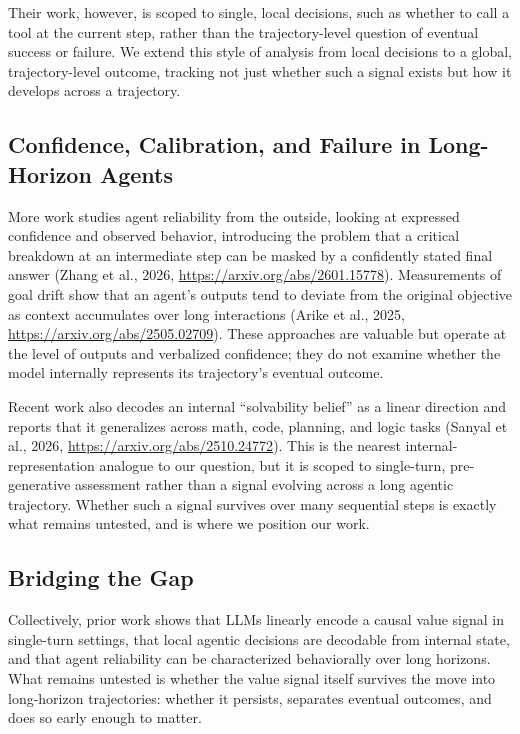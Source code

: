 \documentclass{article}
\begin{document}
Their work, however, is scoped to single, local decisions, such as whether to call a tool at the current step, rather than the trajectory-level question of eventual success or failure. We extend this style of analysis from local decisions to a global, trajectory-level outcome, tracking not just whether such a signal exists but how it develops across a trajectory.

\subsection{Confidence, Calibration, and Failure in Long-Horizon Agents}

More work studies agent reliability from the outside, looking at expressed confidence and observed behavior, introducing the problem that a critical breakdown at an intermediate step can be masked by a confidently stated final answer (Zhang et al., 2026, \url{https://arxiv.org/abs/2601.15778}). Measurements of goal drift show that an agent's outputs tend to deviate from the original objective as context accumulates over long interactions (Arike et al., 2025, \url{https://arxiv.org/abs/2505.02709}). These approaches are valuable but operate at the level of outputs and verbalized confidence; they do not examine whether the model internally represents its trajectory's eventual outcome.

Recent work also decodes an internal ``solvability belief'' as a linear direction and reports that it generalizes across math, code, planning, and logic tasks (Sanyal et al., 2026, \url{https://arxiv.org/abs/2510.24772}). This is the nearest internal-representation analogue to our question, but it is scoped to single-turn, pre-generative assessment rather than a signal evolving across a long agentic trajectory. Whether such a signal survives over many sequential steps is exactly what remains untested, and is where we position our work.

\subsection{Bridging the Gap}

Collectively, prior work shows that LLMs linearly encode a causal value signal in single-turn settings, that local agentic decisions are decodable from internal state, and that agent reliability can be characterized behaviorally over long horizons. What remains untested is whether the value signal itself survives the move into long-horizon trajectories: whether it persists, separates eventual outcomes, and does so early enough to matter.
\end{document}
